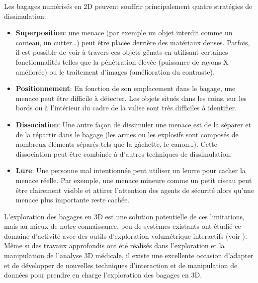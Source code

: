 Les bagages numérisés en 2D peuvent souffrir principalement quatre stratégies de dissimulation:
\begin{itemize}

\item \textbf{Superposition}: une menace (par exemple un objet interdit comme un couteau, un cutter…) peut être placée derrière des matériaux denses. Parfois, il est possible de voir à travers ces objets gênats en utilisant certaines fonctionnalités telles que la pénétration élevée (puissance de rayons X améliorée) ou le traitement d'images (amélioration du contraste). 

\item \textbf{Positionnement}: En fonction de son emplacement dans le bagage, une menace peut être difficile à détecter. Les objets situés dans les coins, sur les bords ou à l'intérieur du cadre de la valise sont très difficiles à identifier.

\item \textbf{Dissociation}: Une autre façon de dissimuler une menace est de la séparer et de la répartir dans le bagage (les armes ou les explosifs sont composés de nombreux éléments séparés tels que la gâchette, le canon…). Cette dissociation peut être combinée à d'autres techniques de dissimulation.

\item \textbf{Lure}: Une personne mal intentionnée peut utiliser un leurre pour cacher la menace réelle. Par exemple, une menace mineure comme un petit ciseau peut être clairement visible et attirer l'attention des agents de sécurité alors qu'une menace plus importante reste cachée.

\end{itemize}

L’exploration des bagages en 3D est une solution potentielle de ces limitations, mais au mieux de notre connaissance, peu de systèmes existants ont étudié ce domaine d’activité avec des outils d’exploration volumétrique interactifs (voir \cite{Li:2012:LVV:2425296.2425325}). Même si des travaux approfondis ont été réalisés dans l'exploration et la manipulation de l'analyse 3D médicale, il existe une excellente occasion  d'adapter et de développer de nouvelles techniques d'interaction et de manipulation de données pour prendre en charge l'exploration des bagages en 3D.

